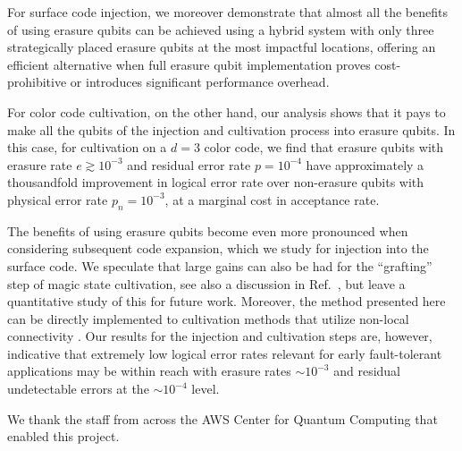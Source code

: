 \documentclass[twocolumn,
notitlepage,
aps,
prx,
floatfix,
superscriptaddress
]{revtex4-2}
\begin{document}
For surface code injection, we moreover demonstrate that almost all the benefits of using erasure qubits can be achieved using a hybrid system with only three strategically placed erasure qubits at the most impactful locations, offering an efficient alternative
when full erasure qubit implementation proves cost-prohibitive or introduces significant performance overhead.

For color code cultivation, on the other hand, our analysis shows that it pays to make all the qubits of the injection and cultivation process into erasure qubits.
In this case, for cultivation on a $d=3$ color code, we find that erasure qubits with erasure rate $e \gtrsim 10^{-3}$ and residual error rate $p=10^{-4}$ have approximately a thousandfold improvement in logical error rate over non-erasure qubits with physical error rate $p_n=10^{-3}$, at a marginal cost in acceptance rate.



The benefits of using erasure qubits become even more pronounced when considering subsequent code expansion, which we study for injection into the surface code. We speculate that large gains can also be had for the ``grafting'' step of magic state cultivation, see also a discussion in Ref.~\cite{vaknin2025cultivation}, but leave a quantitative study of this for future work. Moreover, the method presented here can be directly implemented to cultivation methods that utilize non-local connectivity \cite{vaknin2025cultivation, chen2025efficientmagicstatecultivation}. Our results for the injection and cultivation steps are, however, indicative that extremely low logical error rates relevant for early fault-tolerant applications may be within reach with erasure rates $\sim 10^{-3}$ and residual undetectable errors at the $\sim 10^{-4}$ level.



 \begin{acknowledgments}
We thank the staff from across the AWS Center for
Quantum Computing that enabled this project.
\end{acknowledgments}
\end{document}
